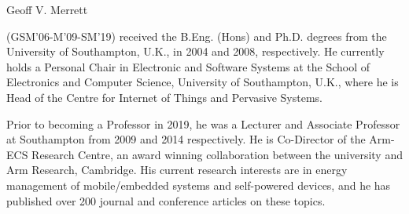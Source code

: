 \documentclass[journal, twoside]{IEEEtran}
\begin{document}
\vspace{-6\baselineskip}

\begin{IEEEbiography}{Geoff V. Merrett}

(GSM'06-M'09-SM’19) received the B.Eng. (Hons) and Ph.D. degrees from the University of Southampton, U.K., in 2004 and 2008, respectively. He currently holds a Personal Chair in Electronic and Software Systems at the School of Electronics and Computer Science, University of Southampton, U.K., where he is Head of the Centre for Internet of Things and Pervasive Systems.

Prior to becoming a Professor in 2019, he was a Lecturer and Associate Professor at Southampton from 2009 and 2014 respectively. He is Co-Director of the Arm-ECS Research Centre, an award winning collaboration between the university and Arm Research, Cambridge. His current research interests are in energy management of mobile/embedded systems and self-powered devices, and he has published over 200 journal and conference articles on these topics.
\end{IEEEbiography}


\vspace{-6\baselineskip}
\end{document}
